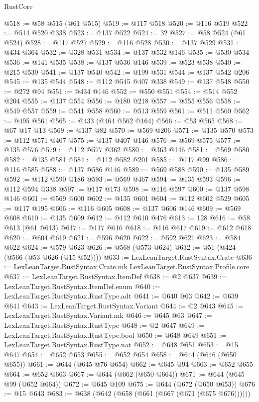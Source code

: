 \begin{lexlean}{RustCore}
\begin{coremodule}
@518 := @58 @515 (@61 @515)
@519 := @117 @518
@520 := @116 @519
@522 := @514 @520 @338
@523 := @137 @522
@524 := 32
@527 := @58 @524 (@61 @524)
@528 := @117 @527
@529 := @116 @528
@530 := @137 @529
@531 := @434 @364
@532 := @328 @531
@534 := @137 @532 @146
@535 := @530 @534
@536 := @141 @535
@538 := @137 @536 @146
@539 := @523 @538
@540 := @215 @539
@541 := @137 @540
@542 := @199 @531
@544 := @137 @542 @206
@545 := @135 @544
@548 := @112 @545 @407 @338
@549 := @137 @548
@550 := @272 @94
@551 := @434 @146
@552 := @550 @551
@554 := @514 @552 @204
@555 := @137 @554
@556 := @180 @218
@557 := @555 @556
@558 := @549 @557
@559 := @541 @558
@560 := @513 @559
@561 := @511 @560
@562 := @495 @561
@565 := @433 (@464 @562 @164)
@566 := @53 @565
@568 := @67 @17 @13
@569 := @137 @82
@570 := @569 @206
@571 := @135 @570
@573 := @112 @571 @407
@575 := @137 @407 @146
@576 := @569 @575
@577 := @135 @576
@579 := @112 @577 @362
@580 := @363 @146
@581 := @569 @580
@582 := @135 @581
@584 := @112 @582 @201
@585 := @117 @99
@586 := @116 @585
@588 := @137 @586 @146
@589 := @569 @588
@590 := @135 @589
@592 := @112 @590 @186
@593 := @569 @467
@594 := @135 @593
@596 := @112 @594 @338
@597 := @117 @173
@598 := @116 @597
@600 := @137 @598 @146
@601 := @569 @600
@602 := @135 @601
@604 := @112 @602 @529
@605 := @117 @195
@606 := @116 @605
@608 := @137 @606 @146
@609 := @569 @608
@610 := @135 @609
@612 := @112 @610 @476
@613 := 128
@616 := @58 @613 (@61 @613)
@617 := @117 @616
@618 := @116 @617
@619 := @612 @618
@620 := @604 @619
@621 := @596 @620
@622 := @592 @621
@623 := @584 @622
@624 := @579 @623
@626 := @568 (@573 @624)
@632 := @51 (@424 (@566 (@53 @626 (@15 @52))))
@633 := LexLeanTarget.RustSyntax.Crate
@636 := LexLeanTarget.RustSyntax.Crate.mk LexLeanTarget.RustSyntax.Profile.core
@637 := LexLeanTarget.RustSyntax.ItemDef
@638 := @2 @637
@639 := LexLeanTarget.RustSyntax.ItemDef.enum
@640 := LexLeanTarget.RustSyntax.RustType.adt
@641 := @640 @63
@642 := @639 @641
@643 := LexLeanTarget.RustSyntax.Variant
@644 := @2 @643
@645 := LexLeanTarget.RustSyntax.Variant.mk
@646 := @645 @63
@647 := LexLeanTarget.RustSyntax.RustType
@648 := @2 @647
@649 := LexLeanTarget.RustSyntax.RustType.bool
@650 := @648 @649
@651 := LexLeanTarget.RustSyntax.RustType.nat
@652 := @648 @651
@653 := @15 @647
@654 := @652 @653
@655 := @652 @654
@658 := @644 (@646 (@650 @655))
@661 := @644 (@645 @76 @654)
@662 := @645 @94
@663 := @652 @655
@664 := @652 @663
@667 := @644 (@662 (@650 @664))
@671 := @644 (@645 @99 (@652 @664))
@672 := @645 @109
@675 := @644 (@672 (@650 @653))
@676 := @15 @643
@683 := @638 (@642 (@658 (@661 (@667 (@671 (@675 @676))))))

\end{coremodule}
\end{lexlean}
